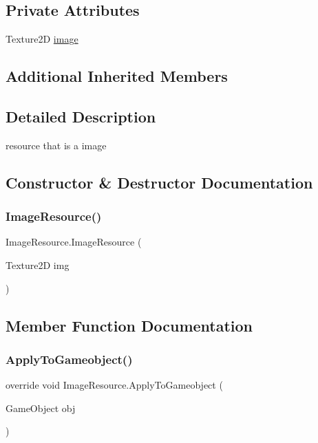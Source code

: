 \subsection*{Private Attributes}
\begin{DoxyCompactItemize}
\item 
Texture2D \mbox{\hyperlink{class_image_resource_ad70b80d140f4bdaa54743a40263ede33}{image}}
\end{DoxyCompactItemize}
\subsection*{Additional Inherited Members}


\subsection{Detailed Description}
resource that is a image 



\subsection{Constructor \& Destructor Documentation}
\mbox{\label{class_image_resource_a2c520197f5e544579eab32d23167b317}} 
\subsubsection{\texorpdfstring{Image\+Resource()}{ImageResource()}}
{\footnotesize\ttfamily Image\+Resource.\+Image\+Resource (\begin{DoxyParamCaption}\item[{Texture2D}]{img }\end{DoxyParamCaption})}



\subsection{Member Function Documentation}
\mbox{\label{class_image_resource_a98a60534e3c84e19caaf327732126d00}} 
\subsubsection{\texorpdfstring{Apply\+To\+Gameobject()}{ApplyToGameobject()}}
{\footnotesize\ttfamily override void Image\+Resource.\+Apply\+To\+Gameobject (\begin{DoxyParamCaption}\item[{Game\+Object}]{obj }\end{DoxyParamCaption})\hspace{0.3cm}{\ttfamily [virtual]}}



